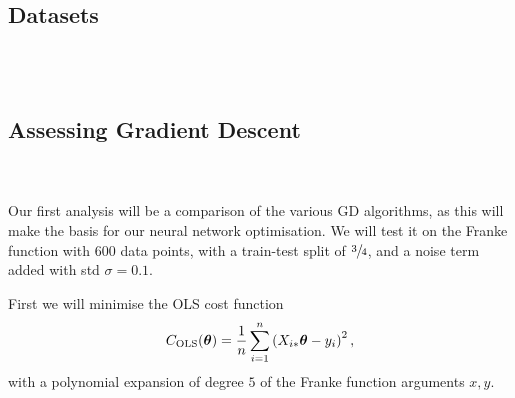 \\
\subsection{Datasets}
    \\
    \\

\subsection{Assessing Gradient Descent}
    \\
    \\
    Our first analysis will be a comparison of the various GD algorithms, as this will make the basis for our neural network optimisation. We will test it on the Franke function with 600 data points, with a train-test split of $\sfrac{3}{4}$, and a noise term added with std $\sigma=0.1$.

    First we will minimise the OLS cost function
    \begin{align}
        {C}_\text{OLS}(\boldsymbol{\theta}) = \frac{1}{n}\sum_{i=1}^n \left(X_{i*}\boldsymbol{\theta} - y_i\right)^2,
    \end{align}
    with a polynomial expansion of degree $5$ of the Franke function arguments $x,y$. 

    